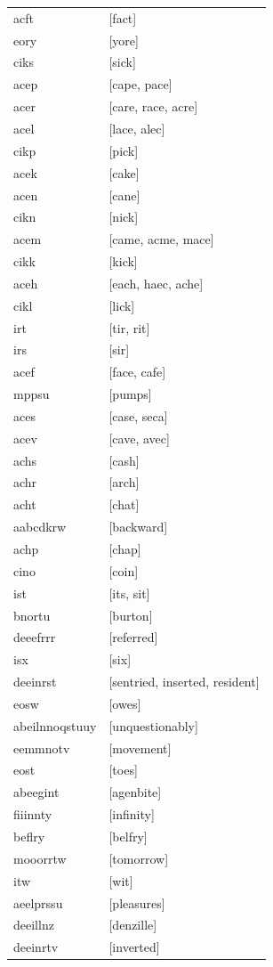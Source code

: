 \documentclass{article}
\begin{document}
\begin{tabular}{ll}
acft & [fact] \\
eory & [yore] \\
ciks & [sick] \\
acep & [cape, pace] \\
acer & [care, race, acre] \\
acel & [lace, alec] \\
cikp & [pick] \\
acek & [cake] \\
acen & [cane] \\
cikn & [nick] \\
acem & [came, acme, mace] \\
cikk & [kick] \\
aceh & [each, haec, ache] \\
cikl & [lick] \\
irt & [tir, rit] \\
irs & [sir] \\
acef & [face, cafe] \\
mppsu & [pumps] \\
aces & [case, seca] \\
acev & [cave, avec] \\
achs & [cash] \\
achr & [arch] \\
acht & [chat] \\
aabcdkrw & [backward] \\
achp & [chap] \\
cino & [coin] \\
ist & [its, sit] \\
bnortu & [burton] \\
deeefrrr & [referred] \\
isx & [six] \\
deeinrst & [sentried, inserted, resident] \\
eosw & [owes] \\
abeilnnoqstuuy & [unquestionably] \\
eemmnotv & [movement] \\
eost & [toes] \\
abeegint & [agenbite] \\
fiiinnty & [infinity] \\
beflry & [belfry] \\
mooorrtw & [tomorrow] \\
itw & [wit] \\
aeelprssu & [pleasures] \\
deeillnz & [denzille] \\
deeinrtv & [inverted] \\

\end{tabular}
\end{document}
